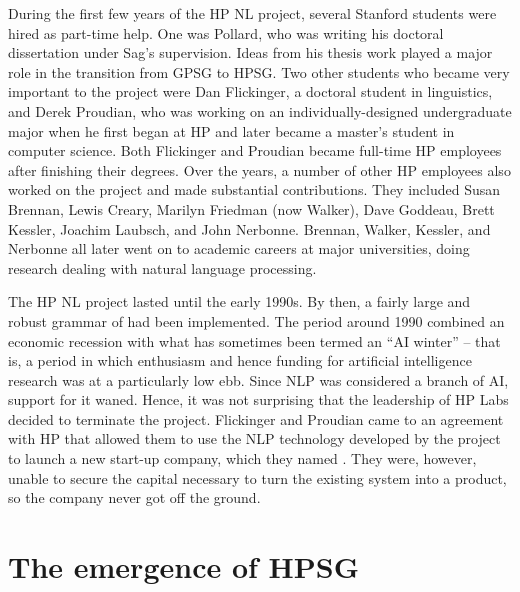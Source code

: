 \documentclass[output=paper
 	        ,biblatex
                ,babelshorthands
                ,newtxmath
                ,draftmode
                ,colorlinks, citecolor=brown
]{langscibook}
\begin{document}
During the first few years of the HP NL project, several Stanford students were hired as part-time help.   One was Pollard, who was writing his doctoral dissertation under Sag's supervision.  Ideas from his thesis work played a major role in the transition from GPSG to HPSG.  Two other students who became very important to the project were Dan Flickinger, a doctoral student in linguistics, and Derek Proudian, who was working on an individually-designed undergraduate major when he first began at HP and later became a master's student in computer science.  Both Flickinger and Proudian became full-time HP employees after finishing their degrees.   Over the years, a number of other HP employees also worked on the project and made substantial contributions.  They included Susan Brennan, Lewis Creary, Marilyn Friedman (now Walker), Dave Goddeau, Brett Kessler, Joachim Laubsch, and John Nerbonne.  Brennan, Walker, Kessler, and Nerbonne all later went on to academic careers at major universities, doing research dealing with natural language processing.

The HP NL project lasted until the early 1990s.  By then, a fairly large and robust grammar of  had been implemented.  The period around 1990 combined an economic recession with what has sometimes been termed an ``AI winter'' -- that is, a period in which enthusiasm and hence funding for artificial intelligence research was at a particularly low ebb.  Since NLP was considered a branch of AI, support for it waned.  Hence, it was not surprising that the leadership of HP Labs decided to terminate the project.  Flickinger and Proudian came to an agreement with HP that allowed them to use the NLP technology developed by the project to launch a new start-up company, which they named .  They were, however, unable to secure the capital necessary to turn the existing system into a product, so the company never got off the ground.

\section{The emergence of HPSG}
\end{document}

